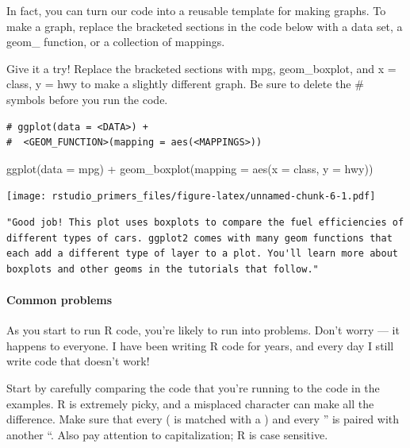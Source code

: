 \documentclass[
]{article}
\newenvironment{Shaded}{\begin{snugshade}}{\end{snugshade}}
\newcommand{\AttributeTok}[1]{\textcolor[rgb]{0.77,0.63,0.00}{#1}}
\newcommand{\FunctionTok}[1]{\textcolor[rgb]{0.00,0.00,0.00}{#1}}
\newcommand{\NormalTok}[1]{#1}
\newcommand{\SpecialCharTok}[1]{\textcolor[rgb]{0.00,0.00,0.00}{#1}}
\begin{document}
In fact, you can turn our code into a reusable template for making
graphs. To make a graph, replace the bracketed sections in the code
below with a data set, a geom\_ function, or a collection of mappings.

Give it a try! Replace the bracketed sections with mpg, geom\_boxplot,
and x = class, y = hwy to make a slightly different graph. Be sure to
delete the \# symbols before you run the code.

\begin{verbatim}
# ggplot(data = <DATA>) + 
#  <GEOM_FUNCTION>(mapping = aes(<MAPPINGS>))
\end{verbatim}

\begin{Shaded}
\begin{Highlighting}[]
\FunctionTok{ggplot}\NormalTok{(}\AttributeTok{data =}\NormalTok{ mpg) }\SpecialCharTok{+} 
  \FunctionTok{geom\_boxplot}\NormalTok{(}\AttributeTok{mapping =} \FunctionTok{aes}\NormalTok{(}\AttributeTok{x =}\NormalTok{ class, }\AttributeTok{y =}\NormalTok{ hwy))}
\end{Highlighting}
\end{Shaded}

\texttt{[image: rstudio\_primers\_files/figure-latex/unnamed-chunk-6-1.pdf]}

\begin{verbatim}
"Good job! This plot uses boxplots to compare the fuel efficiencies of different types of cars. ggplot2 comes with many geom functions that each add a different type of layer to a plot. You'll learn more about boxplots and other geoms in the tutorials that follow."
\end{verbatim}

\hypertarget{common-problems}{%
\paragraph{Common problems}\label{common-problems}}

As you start to run R code, you're likely to run into problems. Don't
worry --- it happens to everyone. I have been writing R code for years,
and every day I still write code that doesn't work!

Start by carefully comparing the code that you're running to the code in
the examples. R is extremely picky, and a misplaced character can make
all the difference. Make sure that every ( is matched with a ) and every
'' is paired with another ``. Also pay attention to capitalization; R is
case sensitive.
\end{document}
